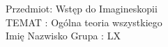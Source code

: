 \thispagestyle{empty}



{\large
Przedmiot: Wstęp do Imagineskopii\\
TEMAT : Ogólna teoria wszystkiego\\
Imię Nazwisko Grupa : LX
}



